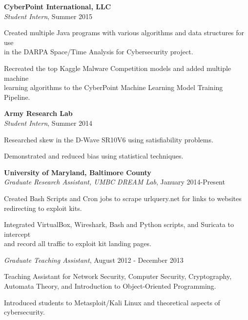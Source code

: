 \medskip
\atab \textbf{CyberPoint International, LLC}\\
\btab \textit{Student Intern}, Summer 2015\\
\begin{my_list}
\item Created multiple Java programs with various algorithms and data structures for use\\ \tab \tab in the DARPA Space/Time Analysis for Cybersecurity project.
\item Recreated the top Kaggle Malware Competition models and added multiple machine\\ \tab \tab learning algorithms to the CyberPoint Machine Learning Model Training Pipeline.
\end{my_list}

\medskip
\atab \textbf{Army Research Lab}\\
\btab \textit{Student Intern}, Summer 2014\\
\begin{my_list}
\item Researched skew in the D-Wave SR10V6 using satisfiability problems.
\item Demonstrated and reduced bias using statistical techniques.
\end{my_list}

\medskip
\atab \textbf{University of Maryland, Baltimore County}\\
\btab \textit{Graduate Research Assistant, UMBC DREAM Lab}, January 2014-Present\\
\begin{my_list}
\item Created Bash Scripts and Cron jobs to scrape urlquery.net for links to websites\\ \tab \tab redirecting to exploit kits.
\item Integrated VirtualBox, Wireshark, Bash and Python scripts, and Suricata to intercept\\ \tab \tab and record all traffic to exploit kit landing pages.
\end{my_list}

\btab \textit{Graduate Teaching Assistant}, August 2012 - December 2013\\
\begin{my_list}
\item Teaching Assistant for Network Security, Computer Security, Cryptography,\\ \tab \tab Automata Theory, and Introduction to Object-Oriented Programming.
\item Introduced students to Metasploit/Kali Linux and theoretical aspects of cybersecurity.
\end{my_list}

